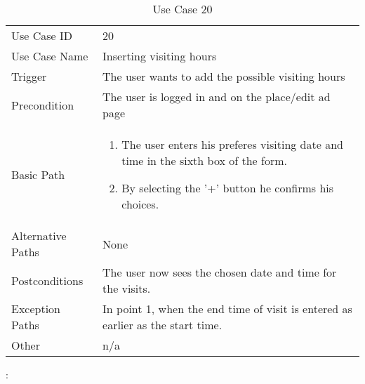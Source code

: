 \begin{table}[H]
\centering
\label{table-use-case-20}
\begin{tabular}{|p{3cm}|p{10cm}}
Use Case ID       & 20                                                      \\
Use Case Name     & Inserting visiting hours                            \\
Trigger           & The user wants to add the possible visiting hours \\
Precondition      & The user is logged in and on the place/edit ad page
\\
Basic Path        & \begin{enumerate}
\item		The user enters his preferes visiting date and time in the sixth box of
the form.
\item  		By selecting the '+' button he confirms his choices.
\end{enumerate} 
     \\
Alternative Paths & None                          \\
Postconditions    & The user now sees the chosen date and time for the visits.
\\
Exception Paths   & In point 1, when the end time of visit is entered as earlier
as the start time.
\\
Other             & n/a                                                                                                                                                                                                        
\end{tabular}
\caption{Use Case 20}:
\end{table}